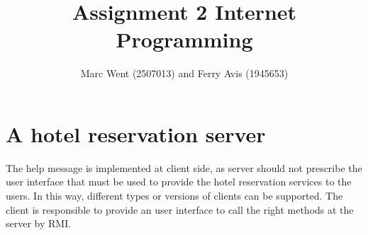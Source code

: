 \documentclass[11pt]{article}
\title{Assignment 2 Internet Programming}
\author{Marc Went (2507013) and Ferry Avis (1945653)}
\begin{document}
\maketitle

\section{A hotel reservation server}

The help message is implemented at client side, as server should not prescribe the user interface that must be used to provide the hotel reservation services to the users. In this way, different types or versions of clients can be supported. The client is responsible to provide an user interface to call the right methods at the server by RMI.  
\end{document}
